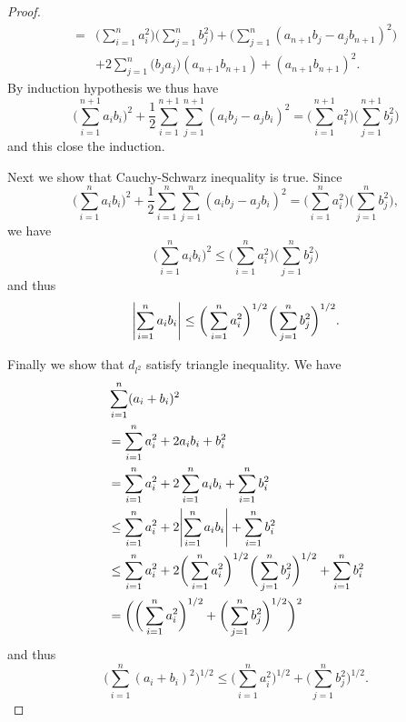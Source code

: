 \begin{proof}
\begin{align*}
        = & \bigg(\sum_{i = 1}^n a_i^2\bigg) \bigg(\sum_{j = 1}^n b_j^2\bigg) + \bigg(\sum_{j = 1}^n (a_{n + 1} b_j - a_j b_{n + 1})^2\bigg)                                                          \\
          & + 2 \sum_{j = 1}^n \bigg(b_j a_j\bigg)(a_{n + 1} b_{n + 1}) + (a_{n + 1} b_{n + 1})^2.
    \end{align*}
    By induction hypothesis we thus have
    \[
        \bigg(\sum_{i = 1}^{n + 1} a_i b_i\bigg)^2 + \frac{1}{2} \sum_{i = 1}^{n + 1} \sum_{j = 1}^{n + 1} (a_i b_j - a_j b_i)^2 = \bigg(\sum_{i = 1}^{n + 1} a_i^2\bigg) \bigg(\sum_{j = 1}^{n + 1} b_j^2\bigg)
    \]
    and this close the induction.

    Next we show that Cauchy-Schwarz inequality is true.
    Since
    \[
        \bigg(\sum_{i = 1}^n a_i b_i\bigg)^2 + \frac{1}{2} \sum_{i = 1}^n \sum_{j = 1}^n (a_i b_j - a_j b_i)^2 = \bigg(\sum_{i = 1}^n a_i^2\bigg) \bigg(\sum_{j = 1}^n b_j^2\bigg),
    \]
    we have
    \[
        \bigg(\sum_{i = 1}^n a_i b_i\bigg)^2 \leq \bigg(\sum_{i = 1}^n a_i^2\bigg) \bigg(\sum_{j = 1}^n b_j^2\bigg)
    \]
    and thus
    \[
        \abs*{\sum_{i = 1}^n a_i b_i} \leq \bigg(\sum_{i = 1}^n a_i^2\bigg)^{1 / 2} \bigg(\sum_{j = 1}^n b_j^2\bigg)^{1 / 2}.
    \]

    Finally we show that \(d_{l^2}\) satisfy triangle inequality.
    We have
    \begin{align*}
         & \sum_{i = 1}^n (a_i + b_i)^2                                                                                                           \\
         & = \sum_{i = 1}^n a_i^2 + 2 a_i b_i + b_i^2                                                                                             \\
         & = \sum_{i = 1}^n a_i^2 + 2 \sum_{i = 1}^n a_i b_i + \sum_{i = 1}^n b_i^2                                                               \\
         & \leq \sum_{i = 1}^n a_i^2 + 2 \abs*{\sum_{i = 1}^n a_i b_i} + \sum_{i = 1}^n b_i^2                                                     \\
         & \leq \sum_{i = 1}^n a_i^2 + 2 \bigg(\sum_{i = 1}^n a_i^2\bigg)^{1 / 2} \bigg(\sum_{j = 1}^n b_j^2\bigg)^{1 / 2} + \sum_{i = 1}^n b_i^2 \\
         & = \bigg(\bigg(\sum_{i = 1}^n a_i^2\bigg)^{1 / 2} + \bigg(\sum_{j = 1}^n b_j^2\bigg)^{1 / 2}\bigg)^2
    \end{align*}
    and thus
    \[
        \bigg(\sum_{i = 1}^n (a_i + b_i)^2\bigg)^{1 / 2} \leq \bigg(\sum_{i = 1}^n a_i^2\bigg)^{1 / 2} + \bigg(\sum_{j = 1}^n b_j^2\bigg)^{1 / 2}.
    \]
\end{proof}

